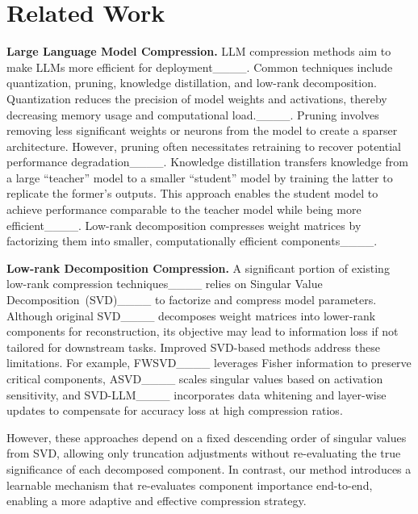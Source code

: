 \section{Related Work}
\noindent \textbf{Large Language Model Compression.}
LLM compression methods aim to make LLMs more efficient for deployment____. Common techniques include quantization, pruning, knowledge distillation, and low-rank decomposition. Quantization reduces the precision of model weights and activations, thereby decreasing memory usage and computational load.____.
Pruning involves removing less significant weights or neurons from the model to create a sparser architecture. However, pruning often necessitates retraining to recover potential performance degradation____. Knowledge distillation transfers knowledge from a large ``teacher'' model to a smaller ``student'' model by training the latter to replicate the former's outputs. This approach enables the student model to achieve performance comparable to the teacher model while being more efficient____. Low-rank decomposition compresses weight matrices by factorizing them into smaller, computationally efficient components____.

\vspace{1mm}
\noindent \textbf{Low-rank Decomposition Compression.}
A significant portion of existing low-rank compression techniques____ relies on Singular Value Decomposition~(SVD)____ to factorize and compress model parameters.
Although original SVD____ decomposes weight matrices into lower-rank components for reconstruction, its objective may lead to information loss if not tailored for downstream tasks. Improved SVD-based methods address these limitations. For example, FWSVD____ leverages Fisher information to preserve critical components, ASVD____ scales singular values based on activation sensitivity, and SVD-LLM____ incorporates data whitening and layer-wise updates to compensate for accuracy loss at high compression ratios.

However, these approaches depend on a fixed descending order of singular values from SVD, allowing only truncation adjustments without re-evaluating the true significance of each decomposed component. In contrast, our method introduces a learnable mechanism that re-evaluates component importance end-to-end, enabling a more adaptive and effective compression strategy.


